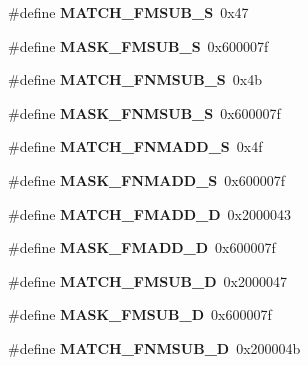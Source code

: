 \begin{DoxyCompactItemize}
\#define {\bfseries M\+A\+T\+C\+H\+\_\+\+F\+M\+S\+U\+B\+\_\+S}~0x47
\item 
\mbox{\label{riscv-utility_8h_a0d3382cf36bfc5e950a985ba003e05c7}} 
\#define {\bfseries M\+A\+S\+K\+\_\+\+F\+M\+S\+U\+B\+\_\+S}~0x600007f
\item 
\mbox{\label{riscv-utility_8h_af4f143d367783159ab222dfc73b3f631}} 
\#define {\bfseries M\+A\+T\+C\+H\+\_\+\+F\+N\+M\+S\+U\+B\+\_\+S}~0x4b
\item 
\mbox{\label{riscv-utility_8h_a4b6dfb2361fb2f4ab9657729b7d31f3d}} 
\#define {\bfseries M\+A\+S\+K\+\_\+\+F\+N\+M\+S\+U\+B\+\_\+S}~0x600007f
\item 
\mbox{\label{riscv-utility_8h_a3cfdf467e6bd2f8d5ca41a983b51121e}} 
\#define {\bfseries M\+A\+T\+C\+H\+\_\+\+F\+N\+M\+A\+D\+D\+\_\+S}~0x4f
\item 
\mbox{\label{riscv-utility_8h_aec1ac7b8ac1ba189209658f37ed1862f}} 
\#define {\bfseries M\+A\+S\+K\+\_\+\+F\+N\+M\+A\+D\+D\+\_\+S}~0x600007f
\item 
\mbox{\label{riscv-utility_8h_a12afbc7cc3b90a6f3eb3c89ee55ef9f8}} 
\#define {\bfseries M\+A\+T\+C\+H\+\_\+\+F\+M\+A\+D\+D\+\_\+D}~0x2000043
\item 
\mbox{\label{riscv-utility_8h_a19b64c3f34c1bdccfd8b01ae5b4b5f65}} 
\#define {\bfseries M\+A\+S\+K\+\_\+\+F\+M\+A\+D\+D\+\_\+D}~0x600007f
\item 
\mbox{\label{riscv-utility_8h_a636f2548d83719a27a7a0509d4d5cec9}} 
\#define {\bfseries M\+A\+T\+C\+H\+\_\+\+F\+M\+S\+U\+B\+\_\+D}~0x2000047
\item 
\mbox{\label{riscv-utility_8h_ab702d4b6d758a26ce1f8e23509733bbc}} 
\#define {\bfseries M\+A\+S\+K\+\_\+\+F\+M\+S\+U\+B\+\_\+D}~0x600007f
\item 
\mbox{\label{riscv-utility_8h_a86e461c097e296a34ddbd41916e4bcac}} 
\#define {\bfseries M\+A\+T\+C\+H\+\_\+\+F\+N\+M\+S\+U\+B\+\_\+D}~0x200004b
\item 

\end{DoxyCompactItemize}

